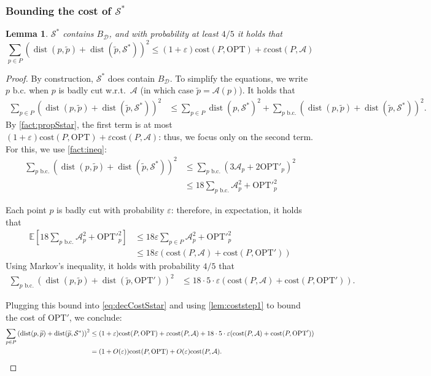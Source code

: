 \documentclass[11pt]{article}
\newtheorem{lemma}[theorem]{Lemma}
\newcommand{\opt}{\text{OPT}}
\newcommand{\eps}{\varepsilon}
\newcommand{\cost}{\mathrm{cost}}
\renewcommand{\tilde}{\widetilde}
\newcommand{\E}{\mathbb{E}}
\newcommand{\calD}{\mathcal {D}}
\newcommand{\calS}{\mathcal {S}}
\newcommand{\calL}{\mathcal{A}}
\newcommand{\badcut}{\eps}
\DeclareMathOperator{\dist}{dist}
\newcommand{\bc}{\text{ b.c.}}
\newcommand{\lpar}{\left(}
\newcommand{\rpar}{\right)}
\begin{document}
\subsubsection{Bounding the cost of $\calS^*$}

\begin{lemma}
  \label{prop:structkmeans}
  $ \calS^*$ contains $B_{\calD}$, and with probability at least $4/5$ it holds that 
  \[\sum_{p \in P} \lpar \dist(p, \tilde p) + \dist(\tilde p,  \calS^*)\rpar^2 \leq (1+\eps)\cost(P, \opt) + \eps \cost(P, \calL)\]
\end{lemma}
\begin{proof}
By construction, $ \calS^*$ does contain $B_\calD$.
To simplify the equations, we write $p \bc$ when $p$ is badly cut w.r.t.\ $\calL$ (in which case $\tilde p = \calL(p)$). It holds that 
\begin{align}
\label{eq:decCostSstar}
    \sum_{p \in P} \lpar \dist(p, \tilde p) + \dist(\tilde p,  \calS^*)\rpar^2 &\leq \sum_{p \in P} \dist( p,  \calS^*)^2 + \sum_{p \bc} \lpar \dist(p, \tilde p) + \dist(\tilde p,  \calS^*)\rpar^2.
\end{align}
By \cref{fact:propSstar}, the first term is at most $(1+\eps)\cost(P, \opt) + \eps \cost(P, \calL)$: thus, we focus only on the second term.
For this, we use \cref{fact:ineq}:
\begin{align*}
    \sum_{p \bc} \lpar \dist(p, \tilde p) + \dist(\tilde p,  \calS^*)\rpar^2 & \leq \sum_{p \bc} \lpar 3\calL_p + 2\opt'_p\rpar^2\\
    &\leq 18\sum_{p \bc}  \calL_p^2 + {\opt'}_p^2
\end{align*}

Each point $p$ is badly cut with probability $\badcut$: therefore, in expectation, it holds that 
\begin{align*}
    \E[18\sum_{p \bc}   \calL_p^2 + {\opt'}_p^2] &\leq 18 \badcut \sum_{p \in P}  \calL_p^2 + {\opt'}_p^2\\
    &\leq 18\badcut (\cost(P, \calL) + \cost(P,  \opt'))
\end{align*}
Using Markov's inequality, it holds with probability $4/5$ that 
\begin{align*}
    \sum_{p \bc} \lpar \dist(p, \tilde p) + \dist(\tilde p,  \opt')\rpar^2 &\leq 18\cdot 5 \cdot \badcut (\cost(P, \calL) + \cost(P,  \opt')).
\end{align*}

Plugging this bound into \cref{eq:decCostSstar} and using \cref{lem:coststep1} to bound the cost of $\opt'$, we conclude:
\begin{align*}
    \sum_{p \in P} \lpar \dist(p, \tilde p) + \dist(\tilde p,  \calS^*)\rpar^2 &\leq (1+\eps)\cost(P, \opt) + \eps \cost(P, \calL)  + 18\cdot 5 \cdot \badcut (\cost(P, \calL) + \cost(P,  \opt')) \\
    &= (1+O(\eps))\cost(P, \opt) + O(\eps)\cost(P, \calL).\qedhere
\end{align*}
\end{proof}
\end{document}

